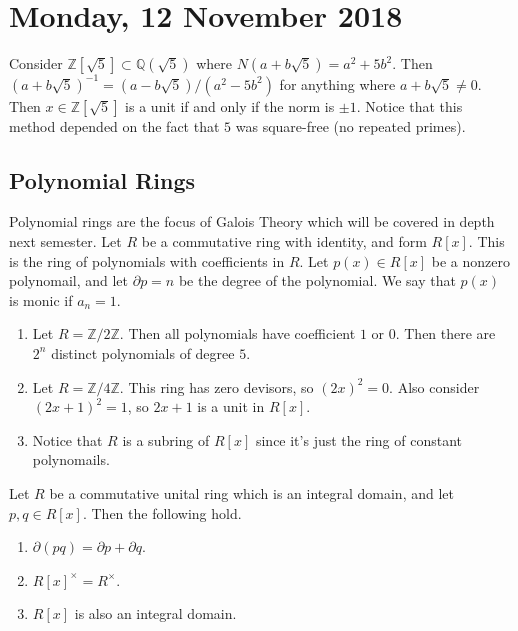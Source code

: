 \section{Monday, 12 November 2018}

\begin{example}
Consider $\mathbb{Z}[\sqrt{5}] \subset \mathbb{Q}(\sqrt{5})$ where $N(a+b\sqrt{5}) = a^2 + 5b^2$. Then $(a+b\sqrt{5})^{-1} = (a-b\sqrt{5})/(a^2-5b^2)$ for anything where $a+b\sqrt{5} \not=0$. Then $x \in \mathbb{Z}[\sqrt{5}]$ is a unit if and only if the norm is $\pm 1$. Notice that this method depended on the fact that $5$ was square-free (no repeated primes).
\end{example}

\subsection{Polynomial Rings}

Polynomial rings are the focus of Galois Theory which will be covered in depth next semester. Let $R$ be a commutative ring with identity, and form $R[x]$. This is the ring of polynomials with coefficients in $R$. Let $p(x) \in R[x]$ be a nonzero polynomail, and let ${\partial p} = n$ be the degree of the polynomial. We say that $p(x)$ is monic if $a_n = 1$.

\begin{example}
\begin{enumerate}
\item Let $R = \mathbb{Z}/2\mathbb{Z}$. Then all polynomials have coefficient $1$ or $0$. Then there are $2^n$ distinct polynomials of degree $5$.

\item Let $R = \mathbb{Z}/4\mathbb{Z}$. This ring has zero devisors, so $(2x)^2 = 0$. Also consider $(2x+1)^2 = 1$, so $2x + 1$ is a unit in $R[x]$.

\item Notice that $R$ is a subring of $R[x]$ since it's just the ring of constant polynomails.
\end{enumerate}
\end{example}

\begin{proposition}
Let $R$ be a commutative unital ring which is an integral domain, and let $p,q \in R[x]$. Then the following hold.
\begin{enumerate}
\item $\partial (pq) = \partial p + \partial q$.
\item $R[x]^\times = R^\times$.
\item $R[x]$ is also an integral domain.
\end{enumerate}
\end{proposition}

